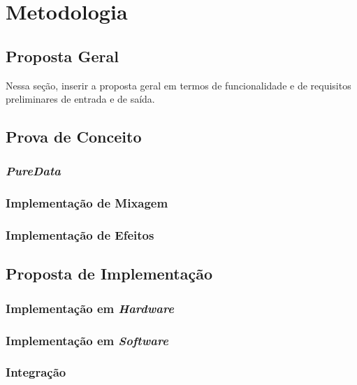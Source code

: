 \chapter[Metodologia]{Metodologia}


\section{Proposta Geral}
Nessa seção, inserir a proposta geral em termos de funcionalidade e de requisitos preliminares de entrada e de saída. 

\section{Prova de Conceito}

\subsection{\textit{PureData}}

\subsection{Implementação de Mixagem}

\subsection{Implementação de Efeitos}

\section{Proposta de Implementação}

\subsection{Implementação em \textit{Hardware}}

\subsection{Implementação em \textit{Software}}

\subsection{Integração}

